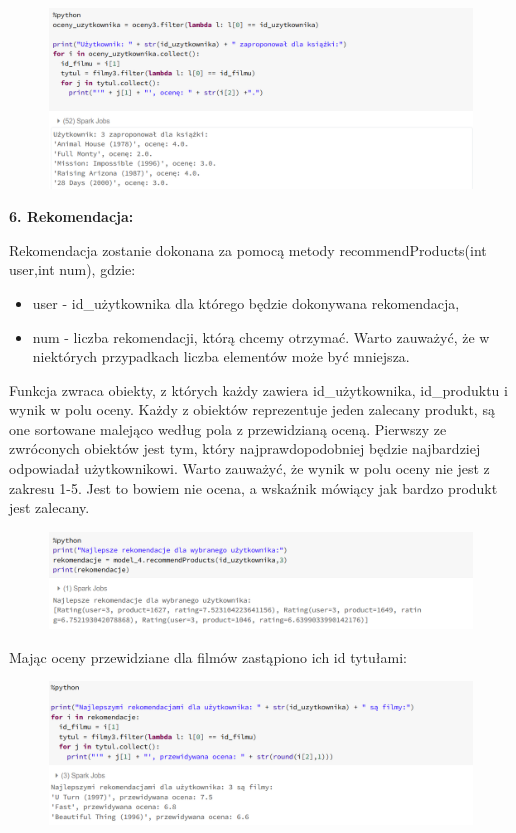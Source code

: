 \documentclass[12pt,a4paper]{report}
\begin{document}
\begin{figure}[H]
\includegraphics[scale=0.5]{obrazy/ALS16.PNG} 
\end{figure}

\textbf{6. Rekomendacja:}

Rekomendacja zostanie dokonana za pomocą metody recommendProducts(int user,int num), gdzie:
\begin{itemize}
\item user - id\_użytkownika dla którego będzie dokonywana rekomendacja,
\item num - liczba rekomendacji, którą chcemy otrzymać. Warto zauważyć, że w niektórych przypadkach liczba elementów może być mniejsza.
\end{itemize}

Funkcja zwraca obiekty, z których każdy zawiera id\_użytkownika, id\_produktu i wynik w polu oceny. Każdy z obiektów reprezentuje jeden zalecany produkt, są one sortowane malejąco według pola z przewidzianą oceną. Pierwszy ze zwróconych obiektów jest tym, który najprawdopodobniej będzie najbardziej odpowiadał użytkownikowi. Warto zauważyć, że wynik w polu oceny nie jest z zakresu 1-5. Jest to bowiem nie ocena, a wskaźnik mówiący jak bardzo produkt jest zalecany.

\begin{figure}[H]
\includegraphics[scale=0.5]{obrazy/ALS17.PNG} 
\end{figure}

Mając oceny przewidziane dla filmów zastąpiono ich id tytułami:

\begin{figure}[H]
\includegraphics[scale=0.5]{obrazy/ALS18.PNG} 
\end{figure}
\end{document}
